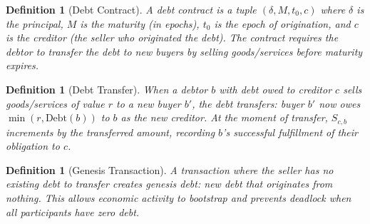 \documentclass[11pt]{article}
\newtheorem{definition}[theorem]{Definition}
\begin{document}
\begin{definition}[Debt Contract]
A debt contract is a tuple $(\delta, M, t_0, c)$ where $\delta$ is the principal, $M$ is the maturity (in epochs), $t_0$ is the epoch of origination, and $c$ is the creditor (the seller who originated the debt). The contract requires the debtor to transfer the debt to new buyers by selling goods/services before maturity expires.
\end{definition}

\begin{definition}[Debt Transfer]
When a debtor $b$ with debt owed to creditor $c$ sells goods/services of value $r$ to a new buyer $b'$, the debt \emph{transfers}: buyer $b'$ now owes $\min(r, \text{Debt}(b))$ to $b$ as the new creditor. At the moment of transfer, $S_{c,b}$ increments by the transferred amount, recording $b$'s successful fulfillment of their obligation to $c$.
\end{definition}

\begin{definition}[Genesis Transaction]
A transaction where the seller has no existing debt to transfer creates \emph{genesis debt}: new debt that originates from nothing. This allows economic activity to bootstrap and prevents deadlock when all participants have zero debt.
\end{definition}
\end{document}
